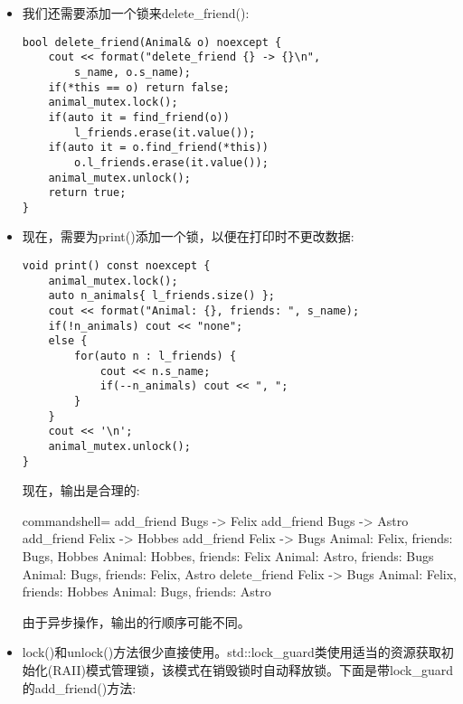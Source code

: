 \begin{itemize}
\begin{lstlisting}[style=styleCXX]
bool add_friend(Animal& o) noexcept {
	cout << format("add_friend {} -> {}\n", s_name, o.s_
	name);
	if(*this == o) return false;
	animal_mutex.lock();
	if(!is_friend(o)) l_friends.emplace_back(o);
	if(!o.is_friend(*this)) o.l_friends.emplace_
	back(*this);
	animal_mutex.unlock();
	return true;
}
\end{lstlisting}

lock()方法尝试获取互斥锁。若互斥锁已经锁定，会等待(块执行)互斥锁打开。

\item 
我们还需要添加一个锁来delete\_friend():

\begin{lstlisting}[style=styleCXX]
bool delete_friend(Animal& o) noexcept {
	cout << format("delete_friend {} -> {}\n",
		s_name, o.s_name);
	if(*this == o) return false;
	animal_mutex.lock();
	if(auto it = find_friend(o))
		l_friends.erase(it.value());
	if(auto it = o.find_friend(*this))
		o.l_friends.erase(it.value());
	animal_mutex.unlock();
	return true;
}
\end{lstlisting}

\item 
现在，需要为print()添加一个锁，以便在打印时不更改数据:

\begin{lstlisting}[style=styleCXX]
void print() const noexcept {
	animal_mutex.lock();
	auto n_animals{ l_friends.size() };
	cout << format("Animal: {}, friends: ", s_name);
	if(!n_animals) cout << "none";
	else {
		for(auto n : l_friends) {
			cout << n.s_name;
			if(--n_animals) cout << ", ";
		}
	}
	cout << '\n';
	animal_mutex.unlock();
}
\end{lstlisting}

现在，输出是合理的:

\begin{tcblisting}{commandshell={}}
add_friend Bugs -> Felix
add_friend Bugs -> Astro
add_friend Felix -> Hobbes
add_friend Felix -> Bugs
Animal: Felix, friends: Bugs, Hobbes
Animal: Hobbes, friends: Felix
Animal: Astro, friends: Bugs
Animal: Bugs, friends: Felix, Astro
delete_friend Felix -> Bugs
Animal: Felix, friends: Hobbes
Animal: Bugs, friends: Astro
\end{tcblisting}

由于异步操作，输出的行顺序可能不同。

\item 
lock()和unlock()方法很少直接使用。std::lock\_guard类使用适当的资源获取初始化(RAII)模式管理锁，该模式在销毁锁时自动释放锁。下面是带lock\_guard的add\_friend()方法:


\end{itemize}
